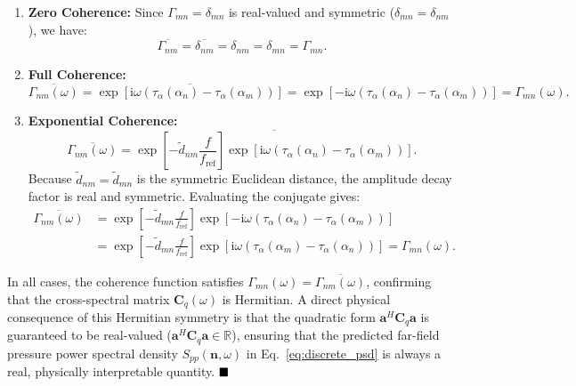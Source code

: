\documentclass[11pt]{article}
\newcommand{\ii}{\mathrm{i}}
\newcommand{\vect}[1]{\bm{#1}}
\newcommand{\mat}[1]{\bm{#1}}
\begin{document}
\begin{enumerate}
    \item \textbf{Zero Coherence:} Since $\Gamma_{mn} = \delta_{mn}$ is real-valued and symmetric ($\delta_{mn} = \delta_{nm}$), we have:
    \begin{equation*}
        \overline{\Gamma_{nm}} = \overline{\delta_{nm}} = \delta_{nm} = \delta_{mn} = \Gamma_{mn}.
    \end{equation*}
    \item \textbf{Full Coherence:}
    \begin{equation*}
        \overline{\Gamma_{nm}(\omega)}
        =
        \overline{\exp\left[ \ii \omega \left( \tau_\alpha(\alpha_n) - \tau_\alpha(\alpha_m) \right) \right]}
        =
        \exp\left[ -\ii \omega \left( \tau_\alpha(\alpha_n) - \tau_\alpha(\alpha_m) \right) \right]
        =
        \Gamma_{mn}(\omega).
    \end{equation*}
    \item \textbf{Exponential Coherence:}
    \begin{equation*}
        \overline{\Gamma_{nm}(\omega)}
        =
        \overline{\exp\left[ - \tilde{d}_{nm} \frac{f}{f_{\mathrm{ref}}} \right] \exp\left[ \ii \omega \left( \tau_\alpha(\alpha_n) - \tau_\alpha(\alpha_m) \right) \right]}.
    \end{equation*}
    Because $\tilde{d}_{nm} = \tilde{d}_{mn}$ is the symmetric Euclidean distance, the amplitude decay factor is real and symmetric. Evaluating the conjugate gives:
    \begin{align*}
        \overline{\Gamma_{nm}(\omega)}
        &=
        \exp\left[ - \tilde{d}_{mn} \frac{f}{f_{\mathrm{ref}}} \right] \exp\left[ -\ii \omega \left( \tau_\alpha(\alpha_n) - \tau_\alpha(\alpha_m) \right) \right]
        \nonumber\\
        &=
        \exp\left[ - \tilde{d}_{mn} \frac{f}{f_{\mathrm{ref}}} \right] \exp\left[ \ii \omega \left( \tau_\alpha(\alpha_m) - \tau_\alpha(\alpha_n) \right) \right]
        =
        \Gamma_{mn}(\omega).
    \end{align*}
\end{enumerate}
In all cases, the coherence function satisfies $\Gamma_{mn}(\omega) = \overline{\Gamma_{nm}(\omega)}$, confirming that the cross-spectral matrix $\mat{C}_q(\omega)$ is Hermitian. A direct physical consequence of this Hermitian symmetry is that the quadratic form $\vect{a}^H \mat{C}_q \vect{a}$ is guaranteed to be real-valued ($\vect{a}^H \mat{C}_q \vect{a} \in \mathbb{R}$), ensuring that the predicted far-field pressure power spectral density $S_{pp}(\vect{n},\omega)$ in Eq.~\ref{eq:discrete_psd} is always a real, physically interpretable quantity. $\hfill \blacksquare$
\end{document}
